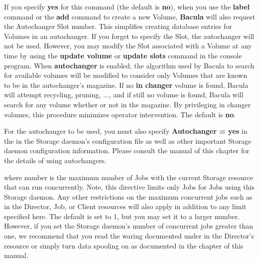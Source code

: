 \begin{description}
\label{Autochanger1}
\item [Autochanger = \lt{}yes\vb{}no\gt{}]  
   If you specify {\bf yes} for this command (the default is {\bf no}),
   when you use the {\bf label} command or the {\bf add} command to create
   a new Volume, {\bf Bacula} will also request the Autochanger Slot
   number.  This simplifies creating database entries for Volumes in an
   autochanger.  If you forget to specify the Slot, the autochanger will
   not be used.  However, you may modify the Slot associated with a Volume
   at any time by using the {\bf update volume} or {\bf update slots}
   command in the console program.  When {\bf autochanger} is enabled, the
   algorithm used by Bacula to search for available volumes will be
   modified to consider only Volumes that are known to be in the
   autochanger's magazine.  If no {\bf in changer} volume is found, Bacula
   will attempt recycling, pruning, ..., and if still no volume is found,
   Bacula will search for any volume whether or not in the magazine.  By
   privileging in changer volumes, this procedure minimizes operator
   intervention.  The default is {\bf no}.

   For the autochanger to be used, you must also specify {\bf Autochanger =
   yes} in the  in the Storage daemon's
   configuration file as well as other important Storage daemon
   configuration information.  Please consult the  manual of this chapter for the
   details of using autochangers.

\item [Maximum Concurrent Jobs = \lt{}number\gt{}]
   where \lt{}number\gt{}  is the maximum number of Jobs with the current
   Storage resource that can run concurrently.  Note, this directive limits
   only Jobs for Jobs using this Storage daemon.  Any other restrictions on
   the maximum concurrent jobs such as in the Director, Job, or Client
   resources will also apply in addition to any limit specified here.  The
   default is set to 1, but you may set it to a larger number.  However, if
   you set the Storage daemon's number of concurrent jobs greater than one,
   we recommend that you read the waring documented under  in the Director's resource or simply
   turn data spooling on as documented in the  chapter of this manual.


\end{description}

